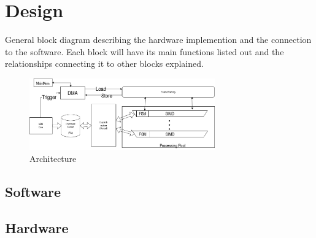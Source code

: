 \chapter{Design}
General block diagram describing the hardware implemention and 
the connection to the software. Each block will have its main functions
listed out and the relationships connecting it to other blocks explained. 
	
\begin{figure}[h]
	\centering\includegraphics[width=8cm]{./images/hardware.png}
	\caption{Architecture}
\end{figure}

\section{Software} 
\section{Hardware}